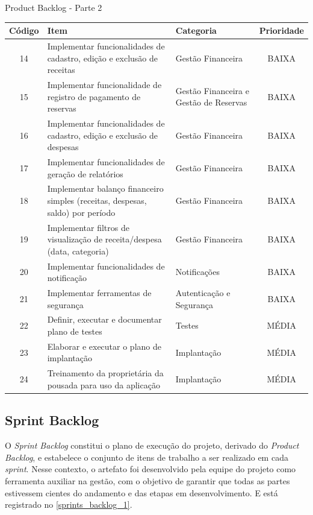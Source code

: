 \documentclass[
	12pt,				%
	openany,			%
	oneside,			%
	a4paper,			%
	english,			%
	french,				%
	spanish,			%
	brazil				%
	]{abntex2}
\begin{document}
%
\begin{quadro}[H]
	\caption{Product Backlog - Parte 2}
	\label{product_backlog_2}
	\begin{tabular}{|c|p{6.5cm}|p{3.8cm}|c|}
		\hline
		\textbf{Código} & \textbf{Item} & \textbf{Categoria} & \textbf{Prioridade} \\	\hline	
		14 & Implementar funcionalidades de cadastro, edição e exclusão de receitas & Gestão Financeira & BAIXA \\ \hline
		15 & Implementar funcionalidade de registro de pagamento de reservas &Gestão Financeira e Gestão de Reservas &
		BAIXA \\ \hline
		16 & Implementar funcionalidades de cadastro, edição e exclusão de despesas &
		Gestão Financeira & BAIXA \\ \hline
		17 & Implementar funcionalidades de geração de relatórios &
		Gestão Financeira &	BAIXA \\ \hline
		18 & Implementar balanço financeiro simples (receitas, despesas, saldo) por período & Gestão Financeira & BAIXA \\ \hline
		19 & Implementar filtros de visualização de receita/despesa (data, categoria) &	Gestão Financeira & BAIXA \\ \hline
		20 & Implementar  funcionalidades de notificação & Notificações &
		BAIXA \\ \hline
		21 & Implementar ferramentas de segurança &	Autenticação e Segurança &
		BAIXA \\ \hline
		22 & Definir, executar e documentar plano de testes & Testes & MÉDIA \\ \hline
		23 & Elaborar e executar o plano de implantação & Implantação & 
		MÉDIA \\ \hline
		24 & Treinamento da proprietária da pousada para uso da aplicação &	Implantação & MÉDIA \\ \hline
	\end{tabular}
\end{quadro}
% 
\subsection{Sprint Backlog}
O \textit{Sprint Backlog} constitui o plano de execução do projeto, derivado do \textit{Product Backlog}, e estabelece o conjunto de itens de trabalho a ser realizado em cada \textit {sprint}. Nesse contexto, o artefato foi desenvolvido pela equipe do projeto como ferramenta auxiliar na gestão, com o objetivo de garantir que todas as partes estivessem cientes do andamento e das etapas em desenvolvimento. E está registrado no  \autoref{sprints_backlog_1}.
\end{document}
